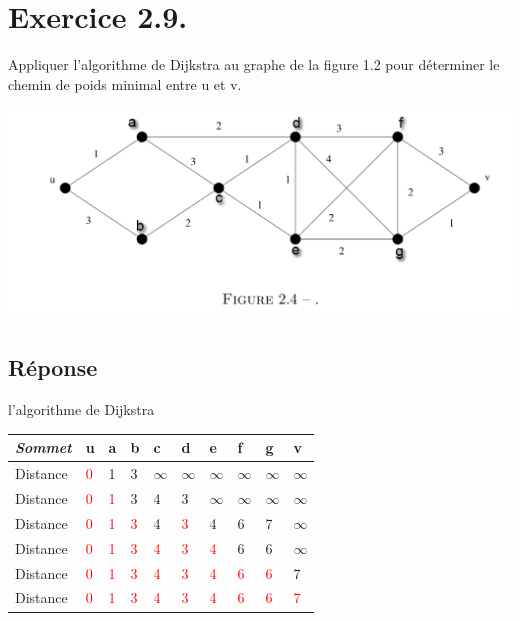 \documentclass[12pt]{fphw}
\begin{document}
\section*{Exercice 2.9.}
\begin{problem}
Appliquer l’algorithme de Dijkstra au graphe de la figure 1.2 pour
déterminer le chemin de poids minimal entre u et v.
\end{problem}
\begin{center}
	\includegraphics[width=1\columnwidth]{Figure2.4.png} %
\end{center}
\subsection*{Réponse}
\begin{center}
l’algorithme de Dijkstra\\
	\begin{tabular}{l l l l l l l l l l}
		\toprule
		\textit{Sommet} & u & a & b & c & d &e & f & g & v\\
		\midrule
		Distance &  \textcolor{red}{0} & 1 &3 & $\infty$ & $\infty$  & $\infty$  & $\infty$  & $\infty$  & $\infty$  \\
		Distance &  \textcolor{red}{0} & \textcolor{red}{1} &3 & 4 & 3  & $\infty$  & $\infty$  & $\infty$  & $\infty$  \\
		Distance &  \textcolor{red}{0} & \textcolor{red}{1} &\textcolor{red}{3} & 4 & \textcolor{red}{3}  & 4  & 6  & 7  & $\infty$  \\
		Distance &  \textcolor{red}{0} & \textcolor{red}{1} &\textcolor{red}{3} & \textcolor{red}{4} & \textcolor{red}{3}  & \textcolor{red}{4}  & 6  & 6  & $\infty$  \\
		Distance &  \textcolor{red}{0} & \textcolor{red}{1} &\textcolor{red}{3} & \textcolor{red}{4} & \textcolor{red}{3}  & \textcolor{red}{4}  & \textcolor{red}{6}  & \textcolor{red}{6}  & 7  \\
		Distance &  \textcolor{red}{0} & \textcolor{red}{1} &\textcolor{red}{3} & \textcolor{red}{4} & \textcolor{red}{3}  & \textcolor{red}{4}  & \textcolor{red}{6}  & \textcolor{red}{6}  & \textcolor{red}{7}  \\
		\bottomrule
	\end{tabular}
\end{center}
\end{document}
